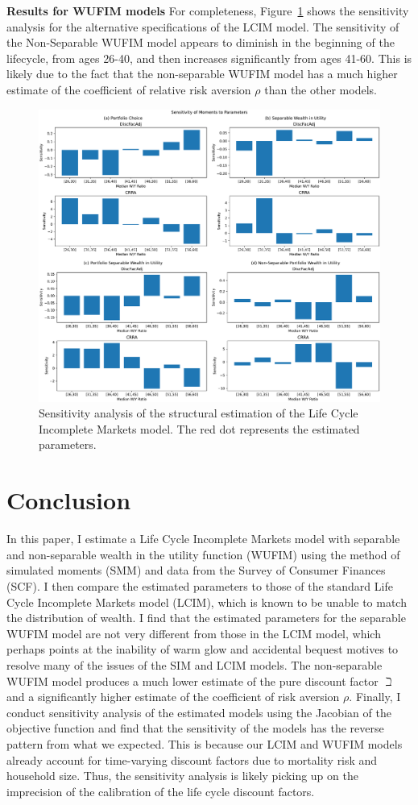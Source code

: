 \documentclass{article}
\newcommand{\CRRA}{\rho}
\begin{document}
\textbf{Results for WUFIM models} For completeness, Figure~\ref{fig:AllSensitivity} shows the sensitivity analysis for the alternative specifications of the LCIM model. The sensitivity of the Non-Separable WUFIM model appears to diminish in the beginning of the lifecycle, from ages 26-40, and then increases significantly from ages 41-60. This is likely due to the fact that the non-separable WUFIM model has a much higher estimate of the coefficient of relative risk aversion $\CRRA$ than the other models.

\begin{figure}[!htbp]
\centering
\includegraphics[width=0.7\linewidth]{files/AllSensitivity-0f14236654de527c752f26a13f644a4c.pdf}
\caption{Sensitivity analysis of the structural estimation of the Life Cycle Incomplete Markets model. The red dot represents the estimated parameters.}
\label{fig:AllSensitivity}
\end{figure}

\section{Conclusion}\label{Conclusion}

In this paper, I estimate a Life Cycle Incomplete Markets model with separable and non-separable wealth in the utility function (WUFIM) using the method of simulated moments (SMM) and data from the Survey of Consumer Finances (SCF). I then compare the estimated parameters to those of the standard Life Cycle Incomplete Markets model (LCIM), which is known to be unable to match the distribution of wealth. I find that the estimated parameters for the separable WUFIM model are not very different from those in the LCIM model, which perhaps points at the inability of warm glow and accidental bequest motives to resolve many of the issues of the SIM and LCIM models. The non-separable WUFIM model produces a much lower estimate of the pure discount factor $\beth$ and a significantly higher estimate of the coefficient of risk aversion $\CRRA$. Finally, I conduct sensitivity analysis of the estimated models using the Jacobian of the objective function and find that the sensitivity of the models has the reverse pattern from what we expected. This is because our LCIM and WUFIM models already account for time-varying discount factors due to mortality risk and household size. Thus, the sensitivity analysis is likely picking up on the imprecision of the calibration of the life cycle discount factors.
\end{document}
